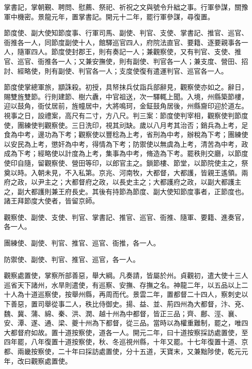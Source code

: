 \begin{pinyinscope}
 掌書記，掌朝覲、聘問、慰薦、祭祀、祈祝之文與號令升絀之事。行軍參謀，關豫軍中機密。景龍元年，置掌書記。開元十二年，罷行軍參謀，尋復置。



 節度使、副大使知節度事、行軍司馬、副使、判官、支使、掌書記、推官、巡官、衙推各一人，同節度副使十人，館驛巡官四人，府院法直官、要籍、逐要親事各一人，隨軍四人。節度使封郡王，則有奏記一人；兼觀察使，又有判官、支使、推官、巡官、衙推各一人；又兼安撫使，則有副使、判官各一人；兼支度、營田、招討、經略使，則有副使、判官各一人；支度使復有遣運判官、巡官各一人。



 節度使掌總軍旅，顓誅殺。初授，具帑抹兵仗詣兵部辭見，觀察使亦如之。辭日，賜雙旌雙節。行則建節、樹六纛，中官祖送，次一驛輒上聞。入境，州縣築節樓，迎以鼓角，衙仗居前，旌幢居中，大將鳴珂，金鉦鼓角居後，州縣齎印迎於道左。視事之日，設禮案，高尺有二寸，方八尺。判三案：節度使判宰相，觀察使判節度使，團練使判觀察使。三日洗印，視其刓缺。歲以八月考其治否；銷兵為上考，足食為中考，邊功為下考；觀察使以豐稔為上考，省刑為中考，辦稅為下考；團練使以安民為上考，懲奸為中考，得情為下考；防禦使以無虞為上考，清苦為中考，政成為下考；經略使以計度為上考，集事為中考，脩造為下考。罷秩則交廳，以節度使印自隨，留觀察使、營田等印，以郎官主之。鎖節樓、節堂，以節院使主之，祭奠以時。入朝未見，不入私第。京兆、河南牧，大都督，大都護，皆親王遙領。兩府之政，以尹主之；大都督府之政，以長史主之；大都護府之政，以副大都護主之，副大都護則兼王府長史。其後有持節為節度、副大使知節度事者，正節度也。諸王拜節度大使者，皆留京師。



 觀察使、副使、支使、判官、掌書記、推官、巡官、衙推、隨軍、要籍、進奏官，各一人。



 團練使、副使、判官、推官、巡官、衙推，各一人。



 防禦使、副使、判官、推官、巡官，各一人。



 觀察處置使，掌察所部善惡，舉大綱。凡奏請，皆屬於州。貞觀初，遣大使十三人巡省天下諸州，水旱則遣使，有巡察、安撫、存撫之名。神龍二年，以五品以上二十人為十道巡察使，按舉州縣，再周而代。景雲二年，置都督二十四人，察刺史以下善惡，置司舉從事二人，秩比侍御史。揚、益、並、荊四州為大都督，汴、兗、魏、冀、蒲、綿、秦、洪、潤、越十州為中都督，皆正三品；齊、鄜、涇、襄、安、潭、遂、通、梁、夔十州為下都督，從三品。當時以為權重難制，罷之，唯四大都督府如故。置十道按察使，道各一人。開元二年，曰十道按察採訪處置使，至四年罷，八年復置十道按察使，秋、冬巡視州縣，十年又罷。十七年復置十道、京都、兩畿按察使，二十年曰採訪處置使，分十五道，天寶末，又兼黜陟使，乾元元年，改曰觀察處置使。




\end{pinyinscope}
